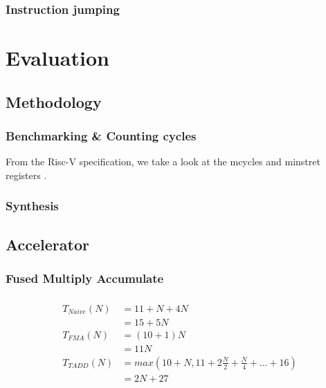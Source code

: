 \documentclass[a4paper,9pt]{report}
\begin{document}
\subsection{Instruction jumping}


\chapter{Evaluation} 
\section{Methodology}
\subsection{Benchmarking \& Counting cycles}
From the Risc-V specification, we take a look at the mcycles and minstret
registers
.
\subsection{Synthesis}

\section{Accelerator}
\subsection{Fused Multiply Accumulate}




\subsection{}

\begin{align*}
  T_{Naive}(N) &= 11+N + 4N \\
  &= 15 + 5N \\
  T_{FMA}(N) &= (10+1)N \\
             &= 11N \\
  T_{TADD}(N) &= max(10+N, 11+2\frac{N}{2} + \frac{N}{4} + ... + 16) \\
             &= 2N+27 
\end{align*}
\end{document}
